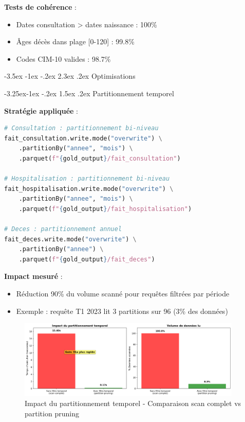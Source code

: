 \documentclass[12pt,a4paper]{article}
\makeatletter
\renewcommand\section{\@startsection{section}{1}{\z@}%
    {-3.5ex \@plus -1ex \@minus -.2ex}%
    {2.3ex \@plus.2ex}%
    {\normalfont\Large\bfseries\color{blue!70!black}}}
\renewcommand\subsection{\@startsection{subsection}{2}{\z@}%
    {-3.25ex\@plus -1ex \@minus -.2ex}%
    {1.5ex \@plus .2ex}%
    {\normalfont\large\bfseries\color{blue!50!black}}}
\makeatother
\begin{document}
\textbf{Tests de cohérence} :
\begin{itemize}
\item Dates consultation > dates naissance : 100\%
\item Âges décès dans plage [0-120] : 99.8\%
\item Codes CIM-10 valides : 98.7\%
\end{itemize}

\newpage
\section{Optimisations}

\subsection{Partitionnement temporel}

\textbf{Stratégie appliquée} :

\begin{lstlisting}[language=Python, basicstyle=\small\ttfamily]
# Consultation : partitionnement bi-niveau
fait_consultation.write.mode("overwrite") \
    .partitionBy("annee", "mois") \
    .parquet(f"{gold_output}/fait_consultation")

# Hospitalisation : partitionnement bi-niveau
fait_hospitalisation.write.mode("overwrite") \
    .partitionBy("annee", "mois") \
    .parquet(f"{gold_output}/fait_hospitalisation")

# Deces : partitionnement annuel
fait_deces.write.mode("overwrite") \
    .partitionBy("annee") \
    .parquet(f"{gold_output}/fait_deces")
\end{lstlisting}

\textbf{Impact mesuré} :
\begin{itemize}
\item Réduction 90\% du volume scanné pour requêtes filtrées par période
\item Exemple : requête T1 2023 lit 3 partitions sur 96 (3\% des données)
\end{itemize}

\begin{figure}[H]
\centering
\includegraphics[width=0.95\textwidth]{partition_impact.png}
\caption{Impact du partitionnement temporel - Comparaison scan complet vs partition pruning}
\label{fig:partition_impact}
\end{figure}
\end{document}
